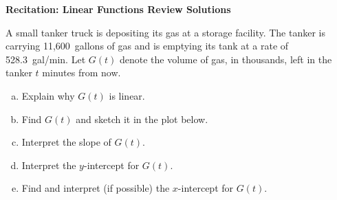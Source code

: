 \documentclass[11pt,letterpaper]{article}
\begin{document}

\phantom{} \hfill {\bfseries \Large Recitation: Linear Functions Review Solutions} \hfill \phantom{} \par\vspace{0.5cm}

{\scriptsize
{} A small tanker truck is depositing its gas at a storage facility. The tanker is carrying 11,600~gallons of gas and is emptying its tank at a rate of 528.3~gal/min. Let $G(t)$ denote the volume of gas, in thousands, left in the tanker $t$ minutes from now. 
	\begin{enumerate}[(a)]
	\item Explain why $G(t)$ is linear. 
	\item Find $G(t)$ and sketch it in the plot below. 
	\item Interpret the slope of $G(t)$.
	\item Interpret the $y$-intercept for $G(t)$.
	\item Find and interpret (if possible) the $x$-intercept for $G(t)$. 
	\end{enumerate}
}
\end{document}
